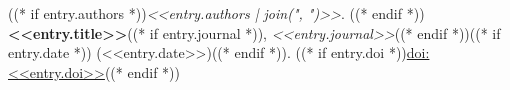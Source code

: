 \resumeSubStart
  \item\small{
    ((* if entry.authors *))\textit{<<entry.authors | join(", ")>>}. ((* endif *))
    \textbf{<<entry.title>>}((* if entry.journal *)), \textit{<<entry.journal>>}((* endif *))((* if entry.date *)) (<<entry.date>>)((* endif *)).
    ((* if entry.doi *))\href{https://doi.org/<<entry.doi>>}{doi:<<entry.doi>>}((* endif *))
  }
\resumeSubEnd
